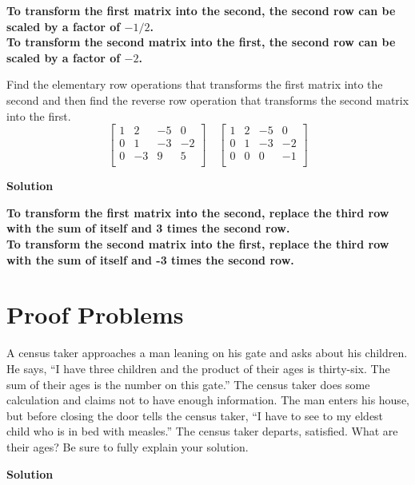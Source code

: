 \documentclass[11pt]{scrartcl}
\theoremstyle{dotlessP}
\theoremstyle{dotlessN}
\begin{document}
	\textbf{To transform the first matrix into the second, the second row can be scaled by a factor of $-1/2$.}	
	\\

	\textbf{To transform the second matrix into the first, the second row can be scaled by a factor of $-2$.}
\begin{ques}
Find the elementary row operations that transforms the first matrix into the second and
then find the reverse row operation that transforms the second matrix into the first.
\[
\begin{bmatrix}
	1 & 2 & -5 & 0 \\
	0 & 1 & -3 & -2 \\
	0 & -3 & 9 & 5 \\
\end{bmatrix} \quad
\begin{bmatrix}
	1 & 2 & -5 & 0 \\
	0 & 1 & -3 & -2 \\
	0 & 0 & 0 & -1 \\
\end{bmatrix}
\] 
\end{ques}
\textbf{Solution}

	\textbf{To transform the first matrix into the second, replace the third row with the sum of itself and 3 times the second row.}
	\\

	\textbf{To transform the second matrix into the first, replace the third row with the sum of itself and -3 times the second row.}
\section{Proof Problems}
\begin{ques}
A census taker approaches a man leaning on his gate and asks about his children. He says, ``I have three children and the product of their ages is thirty-six. The sum of their ages is the number on this gate.'' The census taker does some calculation and claims not to have enough information. The man enters his house, but before closing the door tells the census taker, ``I have to see to my eldest child who is in bed with measles.'' The census taker departs, satisfied. What are their ages? Be sure to fully explain your solution.
\end{ques}
\textbf{Solution}
\end{document}
